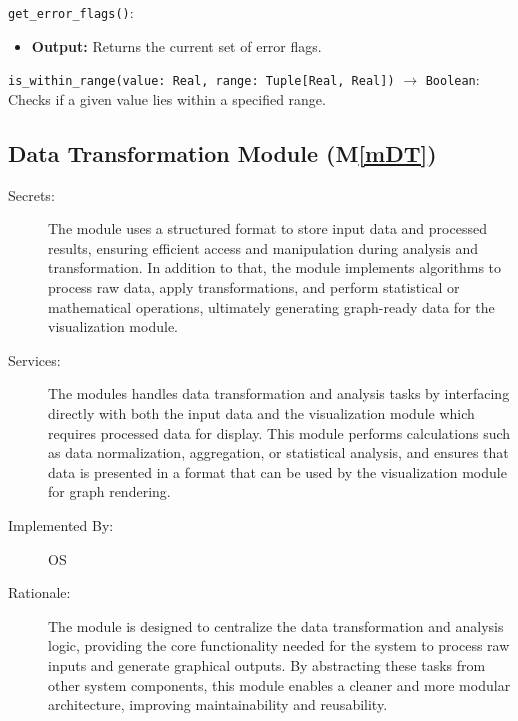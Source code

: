 \documentclass[12pt, titlepage]{article}
\newcommand{\mref}[1]{M\ref{#1}}
\begin{document}
\begin{description}
\begin{description}
  \texttt{get\_error\_flags()}:
  \item
  \begin{itemize}
    \item \textbf{Output:} Returns the current set of error flags.
  \end{itemize}

  \item[Local Function:]
  \item
  \texttt{is\_within\_range(value: Real, range: Tuple[Real, Real])} $\to$ \texttt{Boolean}:\\
  Checks if a given value lies within a specified range.
\end{description}

\subsection{Data Transformation Module (\mref{mDT})}
\begin{description}
  \item[Secrets:] The module uses a structured format to store input data and processed results, ensuring
  efficient access and manipulation during analysis and transformation. In addition to that, the module implements
  algorithms to process raw data, apply transformations, and perform statistical or mathematical operations,
  ultimately generating graph-ready data for the visualization module.
  \item[Services:] The modules handles data transformation and analysis tasks by interfacing directly with both 
  the input data and the visualization module which requires processed data for display. This module performs 
  calculations such as data normalization, aggregation, or statistical analysis, and ensures that data is presented 
  in a format that can be used by the visualization module for graph rendering.
  \item[Implemented By:] OS
  \item[Rationale:] The module is designed to centralize the data transformation and analysis logic, providing the core 
  functionality needed for the system to process raw inputs and generate graphical outputs. By abstracting these tasks 
  from other system components, this module enables a cleaner and more modular architecture, improving maintainability 
  and reusability.
\end{description}


\end{description}
\end{document}
